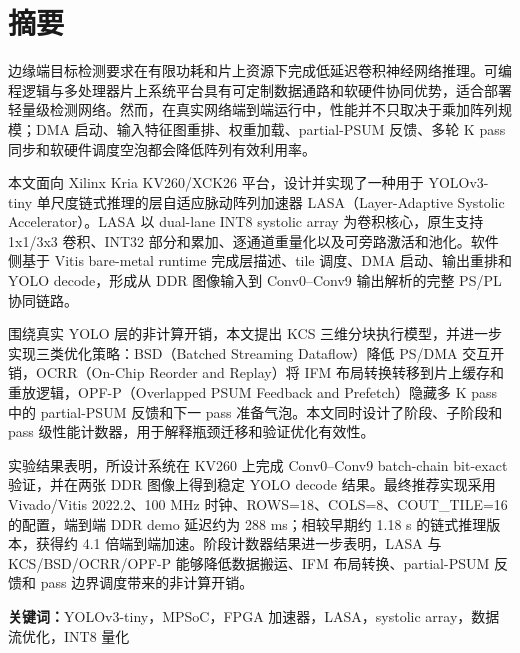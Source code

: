 \chapter*{摘要}

边缘端目标检测要求在有限功耗和片上资源下完成低延迟卷积神经网络推理。可编程逻辑与多处理器片上系统平台具有可定制数据通路和软硬件协同优势，适合部署轻量级检测网络。然而，在真实网络端到端运行中，性能并不只取决于乘加阵列规模；DMA 启动、输入特征图重排、权重加载、partial-PSUM 反馈、多轮 K pass 同步和软硬件调度空泡都会降低阵列有效利用率。

本文面向 Xilinx Kria KV260/XCK26 平台，设计并实现了一种用于 YOLOv3-tiny 单尺度链式推理的层自适应脉动阵列加速器 LASA（Layer-Adaptive Systolic Accelerator）。LASA 以 dual-lane INT8 systolic array 为卷积核心，原生支持 1x1/3x3 卷积、INT32 部分和累加、逐通道重量化以及可旁路激活和池化。软件侧基于 Vitis bare-metal runtime 完成层描述、tile 调度、DMA 启动、输出重排和 YOLO decode，形成从 DDR 图像输入到 Conv0--Conv9 输出解析的完整 PS/PL 协同链路。

围绕真实 YOLO 层的非计算开销，本文提出 KCS 三维分块执行模型，并进一步实现三类优化策略：BSD（Batched Streaming Dataflow）降低 PS/DMA 交互开销，OCRR（On-Chip Reorder and Replay）将 IFM 布局转换转移到片上缓存和重放逻辑，OPF-P（Overlapped PSUM Feedback and Prefetch）隐藏多 K pass 中的 partial-PSUM 反馈和下一 pass 准备气泡。本文同时设计了阶段、子阶段和 pass 级性能计数器，用于解释瓶颈迁移和验证优化有效性。

实验结果表明，所设计系统在 KV260 上完成 Conv0--Conv9 batch-chain bit-exact 验证，并在两张 DDR 图像上得到稳定 YOLO decode 结果。最终推荐实现采用 Vivado/Vitis 2022.2、100 MHz 时钟、ROWS=18、COLS=8、COUT\_TILE=16 的配置，端到端 DDR demo 延迟约为 288 ms；相较早期约 1.18 s 的链式推理版本，获得约 4.1 倍端到端加速。阶段计数器结果进一步表明，LASA 与 KCS/BSD/OCRR/OPF-P 能够降低数据搬运、IFM 布局转换、partial-PSUM 反馈和 pass 边界调度带来的非计算开销。

\medskip
\noindent\textbf{关键词：}YOLOv3-tiny，MPSoC，FPGA 加速器，LASA，systolic array，数据流优化，INT8 量化

